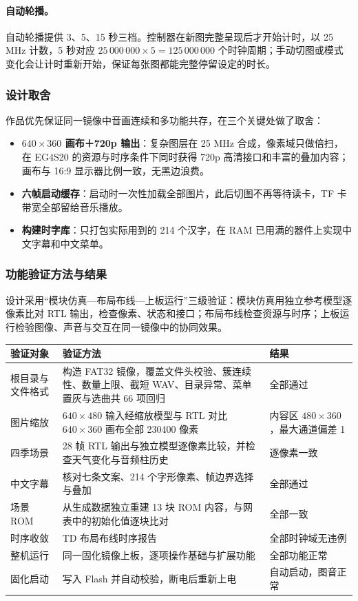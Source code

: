 \paragraph{自动轮播。}自动轮播提供 3、5、15 秒三档。控制器在新图完整呈现后才开始计时，以 25 MHz 计数，5 秒对应 $25\,000\,000\times5=125\,000\,000$ 个时钟周期；手动切图或模式变化会让计时重新开始，保证每张图都能完整停留设定的时长。

\subsubsection{设计取舍}
作品优先保证同一镜像中音画连续和多功能共存，在三个关键处做了取舍：
\begin{itemize}
\item \textbf{$640\times360$ 画布＋720p 输出}：复杂图层在 25 MHz 合成，像素域只做倍扫，在 EG4S20 的资源与时序条件下同时获得 720p 高清接口和丰富的叠加内容；画布与 16:9 显示器比例一致，无黑边浪费。
\item \textbf{六帧启动缓存}：启动时一次性加载全部图片，此后切图不再等待读卡，TF 卡带宽全部留给音乐播放。
\item \textbf{构建时字库}：只打包实际用到的 214 个汉字，在 RAM 已用满的器件上实现中文字幕和中文菜单。
\end{itemize}

\subsubsection{功能验证方法与结果}
设计采用“模块仿真—布局布线—上板运行”三级验证：模块仿真用独立参考模型逐像素比对 RTL 输出，检查像素、状态和接口；布局布线检查资源与时序；上板运行检验图像、声音与交互在同一镜像中的协同效果。

\begin{center}\small
\begin{tabular}{p{3.0cm}p{6.6cm}p{3.6cm}}
\toprule
验证对象 & 验证方法 & 结果\\\midrule
根目录与文件格式 & 构造 FAT32 镜像，覆盖文件头校验、簇连续性、数量上限、截短 WAV、目录异常、菜单置灰与选曲共 66 项回归 & 全部通过\\
图片缩放 & $640\times480$ 输入经缩放模型与 RTL 对比 $640\times360$ 画布全部 230400 像素 & 内容区 $480\times360$，最大通道偏差 1\\
四季场景 & 28 帧 RTL 输出与独立模型逐像素比较，并检查天气变化与音频柱历史 & 逐像素一致\\
中文字幕 & 核对七条文案、214 个字形像素、帧边界选择与叠加 & 全部通过\\
场景 ROM & 从生成数据独立重建 13 块 ROM 内容，与网表中的初始化值逐块比对 & 全部一致\\
时序收敛 & TD 布局布线时序报告 & 全部时钟域无违例\\
整机运行 & 同一固化镜像上板，逐项操作基础与扩展功能 & 全部功能正常\\
固化启动 & 写入 Flash 并自动校验，断电后重新上电 & 自动启动，图音正常\\
\bottomrule
\end{tabular}
\end{center}
